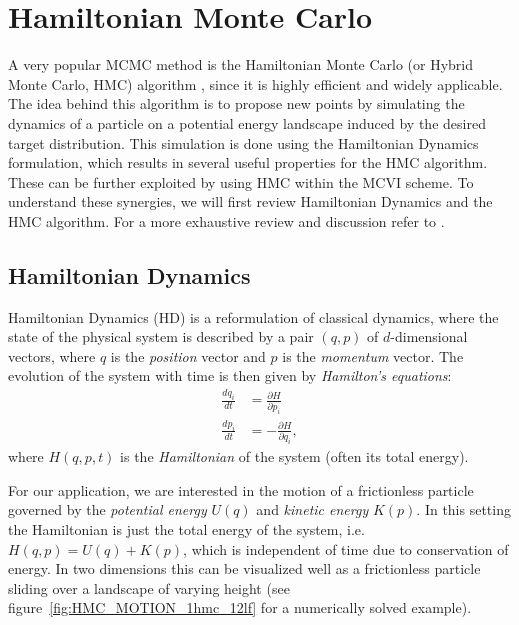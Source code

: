 \section{Hamiltonian Monte Carlo}
\label{sec:HMC}
A very popular MCMC method is the Hamiltonian Monte Carlo (or Hybrid Monte Carlo, HMC) algorithm \parencite{Duane1987}, since it is highly efficient and widely applicable. The idea behind this algorithm is to propose new points by simulating the dynamics of a particle on a potential energy landscape induced by the desired target distribution. This simulation is done using the Hamiltonian Dynamics formulation, which results in several useful properties for the HMC algorithm. These can be further exploited by using HMC within the MCVI scheme. To understand these synergies, we will first review Hamiltonian Dynamics and the HMC algorithm. For a more exhaustive review and discussion refer to \textcite{Neal2011}.

\subsection{Hamiltonian Dynamics}

Hamiltonian Dynamics (HD) is a reformulation of classical dynamics, where the state of the physical system is described by a pair $(q, p)$ of $d$-dimensional vectors, where $q$ is the \textit{position} vector and $p$ is the \textit{momentum} vector. The evolution of the system with time is then given by \textit{Hamilton's equations}:
\begin{equation} \label{eq:HamiltonsEquations}
\begin{split}
\frac{dq_i}{dt} &= \frac{\partial H}{\partial p_i} \\
\frac{dp_i}{dt} &= - \frac{\partial H}{\partial q_i},
\end{split}
\end{equation}
where $H(q, p, t)$ is the \textit{Hamiltonian} of the system (often its total energy).

For our application, we are interested in the motion of a frictionless particle governed by the \textit{potential energy} $U(q)$ and \textit{kinetic energy} $K(p)$. In this setting the Hamiltonian is just the total energy of the system, i.e.\ $H(q, p) = U(q) + K(p)$, which is independent of time due to conservation of energy. In two dimensions this can be visualized well as a frictionless particle sliding over a landscape of varying height (see figure~\ref{fig:HMC_MOTION_1hmc_12lf} for a numerically solved example).

